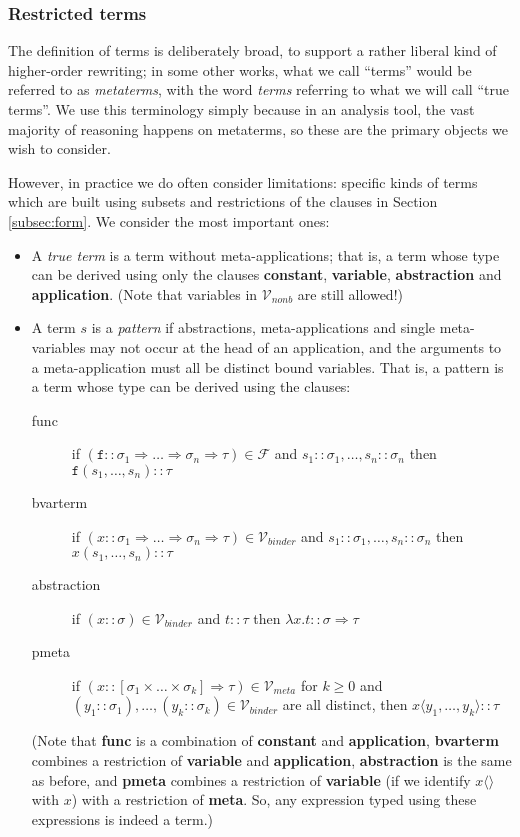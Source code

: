 \documentclass{lmcs}
\theoremstyle{theorem}\newtheorem{theorem}{Theorem}
\theoremstyle{theorem}\newtheorem{lemma}[theorem]{Lemma}
\theoremstyle{theorem}\newtheorem{corollary}[theorem]{Corollary}
\theoremstyle{definition}\newtheorem{definition}[theorem]{Definition}
\theoremstyle{definition}\newtheorem{example}[theorem]{Example}
\newcommand{\F}{\mathcal{F}}
\newcommand{\Vmeta}{\mathcal{V}_{\mathit{meta}}}
\newcommand{\Vfree}{\mathcal{V}_{\mathit{nonb}}}
\newcommand{\Vbound}{\mathcal{V}_{\mathit{binder}}}
\newcommand{\atype}{\sigma}
\newcommand{\btype}{\tau}
\newcommand{\identifier}[1]{\mathtt{#1}}
\newcommand{\afun}{\identifier{f}}
\newcommand{\avar}{x}
\newcommand{\bvar}{y}
\newcommand{\clause}[1]{\textbf{#1}}
\newcommand{\abs}[2]{\lambda #1.#2}
\newcommand{\meta}[2]{#1\langle#2\rangle}
\newcommand{\arrtype}{\Rightarrow}
\newcommand{\mysubsection}[1]{\vspace{-12pt}\subsubsection{#1}}
\begin{document}
\mysubsection{Restricted terms}\label{subsec:termsets}

The definition of terms is deliberately broad, to support a rather liberal kind of higher-order
rewriting; in some other works, what we call ``terms'' would be referred to as \emph{metaterms},
with the word \emph{terms} referring to what we will call ``true terms''.
We use this terminology simply because in an analysis tool, the vast majority of reasoning
happens on metaterms, so these are the primary objects we wish to consider.

However, in practice we do often consider limitations: specific kinds of terms which are built
using subsets and restrictions of the clauses in Section \ref{subsec:form}.  We consider the most
important ones:

\begin{itemize}
\item A \emph{true term} is a term without meta-applications; that is, a term whose type can be
  derived using only the clauses \clause{constant}, \clause{variable}, \clause{abstraction} and
  \clause{application}.
  (Note that variables in $\Vfree$ are still allowed!)
\item A term $s$ is a \emph{pattern} if abstractions, meta-applications and single meta-variables
  may not occur at the head of an application, and the arguments to a meta-application must all be
  distinct bound variables.  That is, a pattern is a term whose type can be derived using the
  clauses:
  \begin{description}
  \item[func] if $(\afun :: \atype_1\!\arrtype\!\dots\!\arrtype\!\atype_n \arrtype \btype) \in \F$
    and $s_1 :: \atype_1,\dots,s_n :: \atype_n$ then $\afun(s_1,\dots,s_n) :: \btype$
  \item[bvarterm] if $(\avar :: \atype_1 \arrtype \dots \arrtype \atype_n \arrtype \btype) \in
    \Vbound$ and $s_1 :: \atype_1,\dots,s_n :: \atype_n$ then $\avar(s_1,\dots,s_n) :: \btype$
  \item[abstraction] if $(\avar :: \atype) \in \Vbound$ and $t :: \btype$ then $\abs{\avar}{t} ::
    \atype \arrtype \btype$
  \item[pmeta] if $(\avar :: [\atype_1 \times \dots \times \atype_k] \arrtype \btype) \in \Vmeta$
    for $k \geq 0$ and $(\bvar_1 :: \atype_1),\dots,(\bvar_k :: \atype_k) \in \Vbound$ are all
    distinct, then $\meta{\avar}{\bvar_1,\dots,\bvar_k} :: \btype$
  \end{description}
  (Note that \clause{func} is a combination of \clause{constant} and \clause{application},
  \clause{bvarterm} combines a restriction of \clause{variable} and \clause{application},
  \clause{abstraction} is the same as before, and \clause{pmeta} combines a restriction of
  \clause{variable} (if we identify $\meta{x}{}$ with $x$) with a restriction of \clause{meta}.
  So, any expression typed using these expressions is indeed a term.)


\end{itemize}
\end{document}
